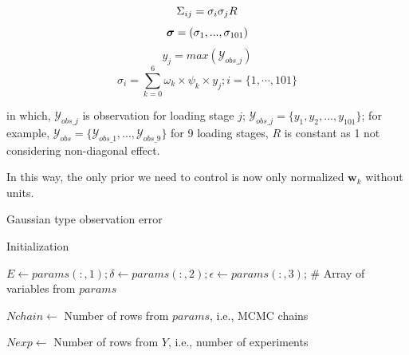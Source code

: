 \documentclass[12pt]{article}%
\theoremstyle{thmstyleone}%
\theoremstyle{thmstyletwo}%
\theoremstyle{thmstylethree}%
\begin{document}
\begin{equation}
        \Sigma_{ij} = \sigma_{i}\sigma_{j}R \\
        \end{equation}
        \begin{equation}
           \boldsymbol{\sigma} = (\sigma_1,...,\sigma_{101}) \\ 
        \end{equation}
\begin{equation}
    y_{j} = max(\mathcal{Y}_{obs\_j})
\end{equation}
        \begin{equation}
\sigma_{i} = \sum_{k=0}^{6} \omega_{k} \times \psi_{k} \times y_{j}; i = \{1,\cdots,101\}
        \end{equation}

in which, $\mathcal{Y}_{obs\_j}$ is observation for  loading stage  $j$; $\mathcal{Y}_{obs\_j} = \{ y_1,y_2,...,y_{101}\}$; for example, $\mathcal{Y}_{obs} = \{\mathcal{Y}_{obs\_1},...,\mathcal{Y}_{obs\_9}  \}$ for 9 loading stages, $R$ is constant as 1 not considering non-diagonal effect.

In this way, the only prior we need to control is now only normalized $\boldsymbol{w}_{k}$ without units.


\begin{algorithm}
    \caption{Gaussian type observation error} \label{alg:loglikelihood}


Initialization\; 

$E \gets params(:,1); \delta \gets params(:,2); \epsilon \gets params(:,3)$; \# Array of variables from $params$ \; 

$Nchain \gets$ Number of rows from $params$, i.e., MCMC chains \; 

$Nexp \gets$  Number of rows from $Y$, i.e., number of experiments \; 


\end{algorithm}
\end{document}
